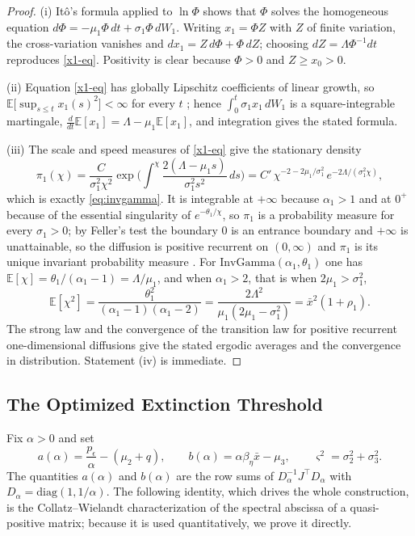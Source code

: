 \documentclass{article}
\newcommand{\betaeta}{\beta_\eta}
\newcommand{\peps}{p_\epsilon}
\begin{document}
\begin{proof}
(i) It\^o's formula applied to $\ln\Phi$ shows that $\Phi$ solves the homogeneous equation $d\Phi=-\mu_1\Phi\,dt+\sigma_1\Phi\,dW_1$. Writing $x_1=\Phi Z$ with $Z$ of finite variation, the cross-variation vanishes and $dx_1=Z\,d\Phi+\Phi\,dZ$; choosing $dZ=\Lambda\Phi^{-1}dt$ reproduces \eqref{x1-eq}. Positivity is clear because $\Phi>0$ and $Z\ge x_0>0$.

(ii) Equation \eqref{x1-eq} has globally Lipschitz coefficients of linear growth, so $\mathbb{E}\big[\sup_{s\le t}x_1(s)^2\big]<\infty$ for every $t$ \citep[Thm.~2.4.1]{Ref1}; hence $\int_0^t\sigma_1x_1\,dW_1$ is a square-integrable martingale, $\tfrac{d}{dt}\mathbb{E}[x_1]=\Lambda-\mu_1\mathbb{E}[x_1]$, and integration gives the stated formula.

(iii) The scale and speed measures of \eqref{x1-eq} give the stationary density
\[
\pi_1(\chi)=\frac{C}{\sigma_1^2\chi^2}\exp\Big(\int^\chi\frac{2(\Lambda-\mu_1 s)}{\sigma_1^2s^2}\,ds\Big)=C'\,\chi^{-2-2\mu_1/\sigma_1^2}\,e^{-2\Lambda/(\sigma_1^2\chi)},
\]
which is exactly \eqref{eq:invgamma}. It is integrable at $+\infty$ because $\alpha_1>1$ and at $0^+$ because of the essential singularity of $e^{-\theta_1/\chi}$, so $\pi_1$ is a probability measure for every $\sigma_1>0$; by Feller's test the boundary $0$ is an entrance boundary and $+\infty$ is unattainable, so the diffusion is positive recurrent on $(0,\infty)$ and $\pi_1$ is its unique invariant probability measure \citep[Ch.~IV]{Ref29}. For $\mathrm{InvGamma}(\alpha_1,\theta_1)$ one has $\mathbb{E}[\chi]=\theta_1/(\alpha_1-1)=\Lambda/\mu_1$, and when $\alpha_1>2$, that is when $2\mu_1>\sigma_1^2$,
\[
\mathbb{E}[\chi^2]=\frac{\theta_1^2}{(\alpha_1-1)(\alpha_1-2)}=\frac{2\Lambda^2}{\mu_1(2\mu_1-\sigma_1^2)}=\bar x^2(1+\rho_1).
\]
The strong law and the convergence of the transition law for positive recurrent one-dimensional diffusions \citep[Ch.~IV]{Ref29} give the stated ergodic averages and the convergence in distribution. Statement (iv) is immediate.
\end{proof}

\subsection{The Optimized Extinction Threshold}

Fix $\alpha>0$ and set
\begin{equation}\label{eq:a_and_b}
a(\alpha)=\frac{\peps}{\alpha}-(\mu_2+q),\qquad b(\alpha)=\alpha\betaeta\bar x-\mu_3,\qquad \varsigma^2=\sigma_2^2+\sigma_3^2 .
\end{equation}
The quantities $a(\alpha)$ and $b(\alpha)$ are the row sums of $D_\alpha^{-1}J^\top D_\alpha$ with $D_\alpha=\mathrm{diag}(1,1/\alpha)$. The following identity, which drives the whole construction, is the Collatz--Wielandt characterization of the spectral abscissa of a quasi-positive matrix; because it is used quantitatively, we prove it directly.
\end{document}
